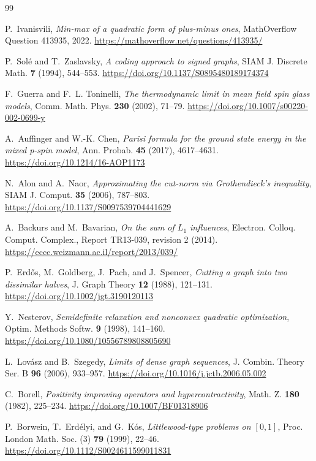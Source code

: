 \documentclass[11pt]{article}
\begin{document}
\begin{thebibliography}{99}

P.~Ivanisvili,
\emph{Min-max of a quadratic form of plus-minus ones},
MathOverflow Question 413935, 2022.
\url{https://mathoverflow.net/questions/413935/}

P.~Sol\'e and T.~Zaslavsky,
\emph{A coding approach to signed graphs},
SIAM J. Discrete Math. \textbf{7} (1994), 544--553.
\url{https://doi.org/10.1137/S0895480189174374}

F.~Guerra and F.~L. Toninelli,
\emph{The thermodynamic limit in mean field spin glass models},
Comm. Math. Phys. \textbf{230} (2002), 71--79.
\url{https://doi.org/10.1007/s00220-002-0699-y}

A.~Auffinger and W.-K. Chen,
\emph{Parisi formula for the ground state energy in the mixed p-spin model},
Ann. Probab. \textbf{45} (2017), 4617--4631.
\url{https://doi.org/10.1214/16-AOP1173}

N.~Alon and A.~Naor,
\emph{Approximating the cut-norm via Grothendieck's inequality},
SIAM J. Comput. \textbf{35} (2006), 787--803.
\url{https://doi.org/10.1137/S0097539704441629}

A.~Backurs and M.~Bavarian,
\emph{On the sum of $L_1$ influences},
Electron. Colloq. Comput. Complex., Report TR13-039, revision 2 (2014).
\url{https://eccc.weizmann.ac.il/report/2013/039/}

P.~Erd\H{o}s, M.~Goldberg, J.~Pach, and J.~Spencer,
\emph{Cutting a graph into two dissimilar halves},
J. Graph Theory \textbf{12} (1988), 121--131.
\url{https://doi.org/10.1002/jgt.3190120113}

Y.~Nesterov,
\emph{Semidefinite relaxation and nonconvex quadratic optimization},
Optim. Methods Softw. \textbf{9} (1998), 141--160.
\url{https://doi.org/10.1080/10556789808805690}

L.~Lov\'asz and B.~Szegedy,
\emph{Limits of dense graph sequences},
J. Combin. Theory Ser. B \textbf{96} (2006), 933--957.
\url{https://doi.org/10.1016/j.jctb.2006.05.002}

C.~Borell,
\emph{Positivity improving operators and hypercontractivity},
Math. Z. \textbf{180} (1982), 225--234.
\url{https://doi.org/10.1007/BF01318906}

P.~Borwein, T.~Erd\'elyi, and G.~K\'os,
\emph{Littlewood-type problems on $[0,1]$},
Proc. London Math. Soc. (3) \textbf{79} (1999), 22--46.
\url{https://doi.org/10.1112/S0024611599011831}


\end{thebibliography}
\end{document}
